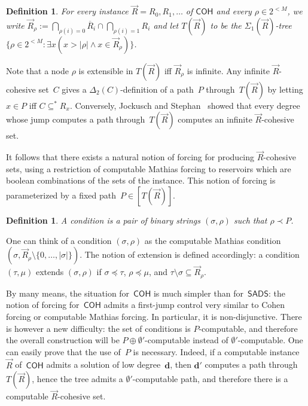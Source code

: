 \documentclass{article}
\newcommand{\SADS}[0]{\mathsf{SADS}}
\newcommand{\COH}[0]{\mathsf{COH}}
\numberwithin{theorem}{section}
\newtheorem{definition}[theorem]{Definition}
\begin{document}
\begin{definition}
    For every instance $\vec{R} = R_0, R_1, \dots$ of $\COH$ and every $\rho \in 2^{<M}$, we write $\vec{R}_\rho := \bigcap_{\rho(i) = 0} \overline{R}_i \cap \bigcap_{\rho(i) = 1} R_i$ and let $T(\vec{R})$ to be the $\Sigma_1(\vec{R})$-tree $\{ \rho \in 2^{<M} : \exists x (x > |\rho| \wedge x \in \vec{R}_\rho) \}$.
\end{definition}

Note that a node $\rho$ is extensible in $T(\vec{R})$ iff $\vec{R}_\rho$ is infinite. Any infinite $\vec{R}$-cohesive set~$C$ gives a $\Delta_2(C)$-definition of a path~$P$ through~$T(\vec{R})$ by letting~$x \in P$ iff $C \subseteq^* R_x$. Conversely, Jockusch and Stephan~\cite{jockusch1993cohesive} showed that every degree whose jump computes a path through~$T(\vec{R})$ computes an infinite $\vec{R}$-cohesive set.

It follows that there exists a natural notion of forcing for producing $\vec{R}$-cohesive sets, using a restriction of computable Mathias forcing to reservoirs which are boolean combinations of the sets of the instance. This notion of forcing is parameterized by a fixed path~$P \in [T(\vec{R})]$.

\begin{definition}
A \emph{condition} is a pair of binary strings $(\sigma, \rho)$ such that $\rho \prec P$.    
\end{definition}

One can think of a condition $(\sigma, \rho)$ as the computable Mathias condition $(\sigma, \vec{R}_\rho \setminus \{0, \dots, |\sigma| \})$. The notion of extension is defined accordingly: a condition $(\tau, \mu)$ extends $(\sigma, \rho)$ if $\sigma \preceq \tau$, $\rho \preceq \mu$, and $\tau \setminus \sigma \subseteq \vec{R}_\rho$.

By many means, the situation for~$\COH$ is much simpler than for~$\SADS$: the notion of forcing for~$\COH$ admits a first-jump control very similar to Cohen forcing or computable Mathias forcing. In particular, it is non-disjunctive.
There is however a new difficulty: the set of conditions is $P$-computable, and therefore the overall construction will be $P \oplus \emptyset'$-computable instead of $\emptyset'$-computable. One can easily prove that the use of~$P$ is necessary. Indeed, if a computable instance~$\vec{R}$ of~$\COH$ admits a solution of low degree~$\mathbf{d}$, then $\mathbf{d}'$ computes a path through $T(\vec{R})$, hence the tree admits a $\emptyset'$-computable path, and therefore there is a computable $\vec{R}$-cohesive set.
\end{document}
